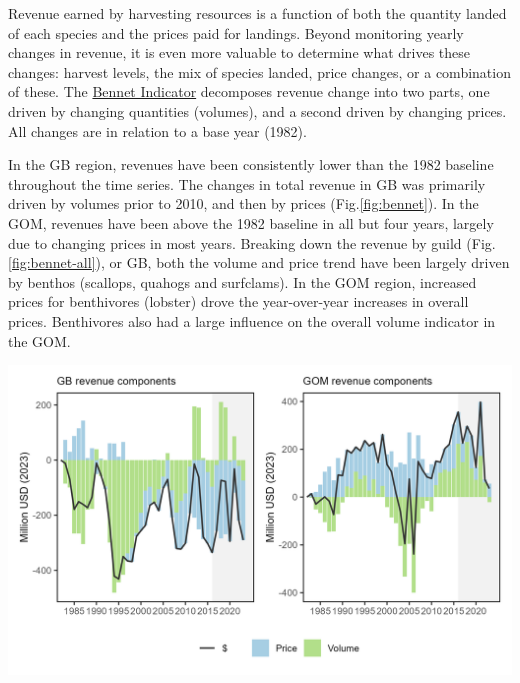\documentclass[
  10pt,
]{article}
\let\origfigure\figure
\let\endorigfigure\endfigure
\renewenvironment{figure}[1][2] {
    \expandafter\origfigure\expandafter[H]
} {
    \endorigfigure
}
\begin{document}
Revenue earned by harvesting resources is a function of both the quantity landed of each species and the prices paid for landings. Beyond monitoring yearly changes in revenue, it is even more valuable to determine what drives these changes: harvest levels, the mix of species landed, price changes, or a combination of these. The \href{https://noaa-edab.github.io/catalog/bennet.html}{Bennet Indicator} decomposes revenue change into two parts, one driven by changing quantities (volumes), and a second driven by changing prices. All changes are in relation to a base year (1982).

In the GB region, revenues have been consistently lower than the 1982 baseline throughout the time series. The changes in total revenue in GB was primarily driven by volumes prior to 2010, and then by prices (Fig.\ref{fig:bennet}). In the GOM, revenues have been above the 1982 baseline in all but four years, largely due to changing prices in most years. Breaking down the revenue by guild (Fig. \ref{fig:bennet-all}), or GB, both the volume and price trend have been largely driven by benthos (scallops, quahogs and surfclams). In the GOM region, increased prices for benthivores (lobster) drove the year-over-year increases in overall prices. Benthivores also had a large influence on the overall volume indicator in the GOM.

\begin{figure}

{\centering \includegraphics[width=6.5in]{images/NewEngland/bennet_NewEngland_2025-09-09} 

}

\caption{Revenue change from the 1982 baseline in 2023 dollars (black), price, and volume for commercial landings from Georges Bank (GB: left) and the Gulf of Maine (GOM: right)}\label{fig:bennet-82}
\end{figure}
\end{document}
